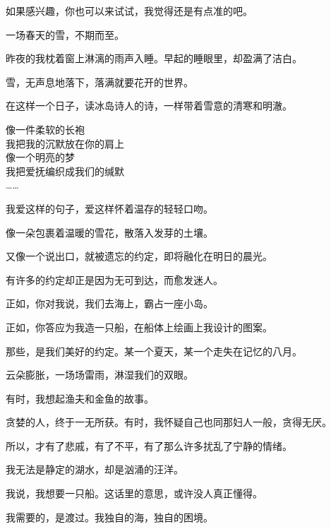 		如果感兴趣，你也可以来试试，我觉得还是有点准的吧。


	\endwriting



		一场春天的雪，不期而至。\par
		昨夜的我枕着窗上淋漓的雨声入睡。早起的睡眼里，却盈满了洁白。\par
		雪，无声息地落下，落满就要花开的世界。

		在这样一个日子，读冰岛诗人的诗，一样带着雪意的清寒和明澈。

		\longpoem{}{}{}
			像一件柔软的长袍 \\
			我把我的沉默放在你的肩上 \\
			像一个明亮的梦 \\
			我把爱抚编织成我们的缄默 \\
			……
		\endlongpoem

		我爱这样的句子，爱这样怀着温存的轻轻口吻。\par
		像一朵包裹着温暖的雪花，散落入发芽的土壤。\par
		又像一个说出口，就被遗忘的约定，即将融化在明日的晨光。\par
		有许多的约定却正是因为无可到达，而愈发迷人。\par
		正如，你对我说，我们去海上，霸占一座小岛。\par
		正如，你答应为我造一只船，在船体上绘画上我设计的图案。\par
		那些，是我们美好的约定。某一个夏天，某一个走失在记忆的八月。\par
		云朵膨胀，一场场雷雨，淋湿我们的双眼。

		\vspace{1em}
		有时，我想起渔夫和金鱼的故事。\par
		贪婪的人，终于一无所获。有时，我怀疑自己也同那妇人一般，贪得无厌。\par
		所以，才有了悲戚，有了不平，有了那么许多扰乱了宁静的情绪。\par
		我无法是静定的湖水，却是汹涌的汪洋。\par
		我说，我想要一只船。这话里的意思，或许没人真正懂得。\par
		我需要的，是渡过。我独自的海，独自的困境。

